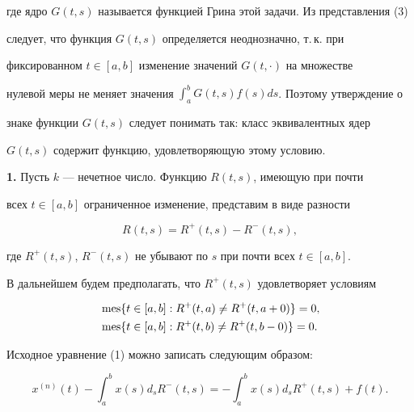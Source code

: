 где ядро $G(t,s)$ называется функцией Грина этой задачи. Из представления (3) 


следует, что функция $G(t,s)$ определяется неоднозначно, т.\,к. при 


фиксированном $t\in[a,b]$ изменение значений $G(t,\cdot)$ на множестве 


нулевой меры не меняет значения $\int_a^bG(t,s)f(s)ds$. Поэтому утверждение о 


знаке функции $G(t,s)$ следует понимать так: класс эквивалентных ядер 


$G(t,s)$ содержит функцию, удовлетворяющую этому условию. 


 


{\bf 1.} Пусть $k$ --- нечетное число. Функцию $R(t,s)$, имеющую при почти 


всех $t\in[a,b]$ ограниченное изменение, представим в виде разности 


%


\begin{equation} 


R(t,s)=R^+(t,s)-R^-(t,s), 


\end{equation} 


где $R^+(t,s)$, $R^-(t,s)$ не убывают по $s$ при почти всех $t\in[a,b]$. 


 


В дальнейшем будем предполагать, что $R^+(t,s)$ удовлетворяет условиям 


\begin{align} 


\begin{split} 


& \mes\{t\in[a,b]:R^+(t,a)\ne R^+(t,a+0)\}=0,\\ 


& \mes\{t\in[a,b]:R^+(t,b)\ne R^+(t,b-0)\}=0. 


\end{split} 


\end{align} 


Исходное уравнение (1) можно записать следующим образом: 


\begin{equation} 


x^{(n)}(t)-\int^b_a x(s)d_sR^-(t,s)= 


-\int^b_a x(s)d_sR^+(t,s)+f(t). 


\end{equation} 


